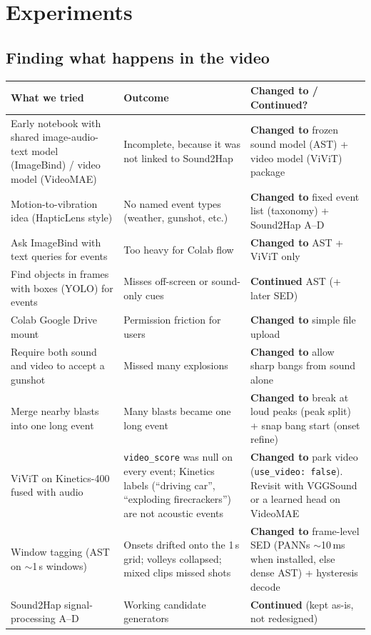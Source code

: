\documentclass[11pt,a4paper]{article}
\begin{document}
\section{Experiments}

\subsection*{Finding what happens in the video}
\begin{center}
\small
\begin{tabularx}{\textwidth}{@{}>{\raggedright\arraybackslash}p{4cm}>{\raggedright\arraybackslash}p{4cm}>{\raggedright\arraybackslash}X@{}}
\toprule
\textbf{What we tried} & \textbf{Outcome} & \textbf{Changed to / Continued?} \\
\midrule
Early notebook with shared image-audio-text model (ImageBind) / video model (VideoMAE) & Incomplete, because it was not linked to Sound2Hap & \textbf{Changed to} frozen sound model (AST) + video model (ViViT) package \\
\addlinespace
Motion-to-vibration idea (HapticLens style) & No named event types (weather, gunshot, etc.) & \textbf{Changed to} fixed event list (taxonomy) + Sound2Hap A--D \\
\addlinespace
Ask ImageBind with text queries for events & Too heavy for Colab flow & \textbf{Changed to} AST + ViViT only \\
\addlinespace
Find objects in frames with boxes (YOLO) for events & Misses off-screen or sound-only cues & \textbf{Continued} AST (+ later SED) \\
\addlinespace
Colab Google Drive mount & Permission friction for users & \textbf{Changed to} simple file upload \\
\addlinespace
Require both sound and video to accept a gunshot & Missed many explosions & \textbf{Changed to} allow sharp bangs from sound alone \\
\addlinespace
Merge nearby blasts into one long event & Many blasts became one long event & \textbf{Changed to} break at loud peaks (peak split) + snap bang start (onset refine) \\
\addlinespace
ViViT on Kinetics-400 fused with audio & \texttt{video\_score} was null on every event; Kinetics labels (``driving car'', ``exploding firecrackers'') are not acoustic events & \textbf{Changed to} park video (\texttt{use\_video: false}). Revisit with VGGSound or a learned head on VideoMAE \\
\addlinespace
Window tagging (AST on $\sim$1\,s windows) & Onsets drifted onto the 1\,s grid; volleys collapsed; mixed clips missed shots & \textbf{Changed to} frame-level SED (PANNs $\sim$10\,ms when installed, else dense AST) + hysteresis decode \\
\addlinespace
Sound2Hap signal-processing A--D & Working candidate generators & \textbf{Continued} (kept as-is, not redesigned) \\
\bottomrule
\end{tabularx}
\end{center}
\end{document}

